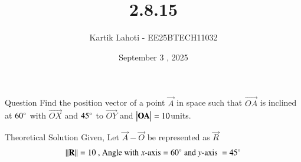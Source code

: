 \documentclass{beamer}
\title %
{2.8.15}
\date{September 3 , 2025}
\author 
{Kartik Lahoti - EE25BTECH11032}
\begin{document}
\frame{\titlepage}
\begin{frame}{Question}
Find the position vector of a point $\vec{A}$ in space such that $\vec{OA}$ is inclined at $60\degree$ with $\vec{OX}$ and $45\degree$ to $\vec{OY}$ and $\begin{vmatrix}\mathbf{OA}\end{vmatrix} = 10 $units.
\end{frame}



\begin{frame}{Theoretical Solution}
Given,
Let $\vec{A} - \vec{O}$ be represented as $\vec{R}$
\begin{align}
    \left\lVert\mathbf{R}\right\rVert = 10 \text{ , Angle with } x\text{-axis} = 60\degree \text{ and } y\text{-axis } = 45\degree
\end{align}

\end{frame}
\end{document}
